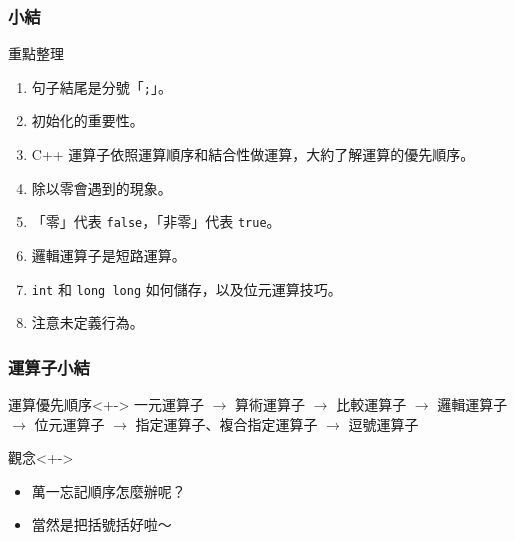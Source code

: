 \documentclass[utf8]{beamer}
\begin{document}
\begin{CJK}{UTF8}{bkai}
\begin{frame}[fragile]
  \frametitle{小結}
  \begin{alertblock}{重點整理}
    \begin{enumerate}[<+->]
    \item 句子結尾是分號「\lstinline{;}{}」。
    \item 初始化的重要性。
    \item C++ 運算子依照運算順序和結合性做運算，大約了解運算的優先順序。
    \item 除以零會遇到的現象。
    \item 「零」代表 \lstinline{false}{}，「非零」代表 \lstinline{true}{}。
    \item 邏輯運算子是短路運算。
    \item \lstinline{int}{} 和 \lstinline{long long}{} 如何儲存，以及位元運算技巧。
    \item 注意未定義行為。
    \end{enumerate}
  \end{alertblock}
\end{frame}

\begin{frame}
  \frametitle{運算子小結}
  \begin{exampleblock}{運算優先順序}<+->
  一元運算子 $\rightarrow$ 算術運算子 $\rightarrow$ 比較運算子 $\rightarrow$ 邏輯運算子 $\rightarrow$ 位元運算子 $\rightarrow$ 指定運算子、複合指定運算子 $\rightarrow$ 逗號運算子
  \end{exampleblock}
  \begin{alertblock}{觀念}<+->
    \begin{itemize}
    \item 萬一忘記順序怎麼辦呢？
    \item<+-> 當然是把\alert{括號括好}啦～
    \end{itemize}
  \end{alertblock}
\end{frame}

\clearpage
\end{CJK}
\end{document}
